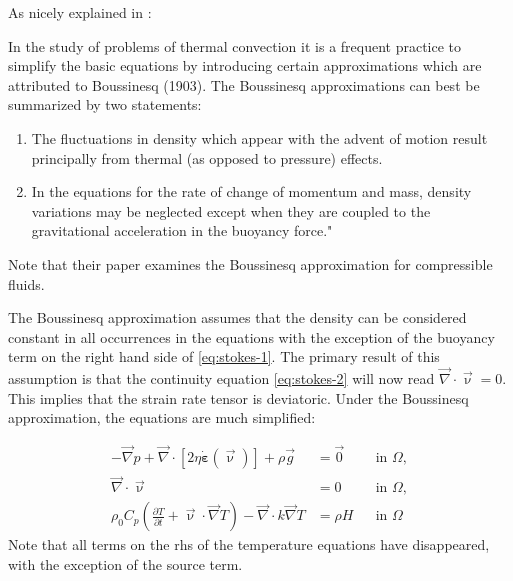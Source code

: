 \documentclass[a4paper]{article}
\begin{document}
\noindent As nicely explained in \textcite{spve60}: 
\begin{displayquote}
{\color{darkgray}
In the study of problems of thermal convection it is a frequent practice to simplify the basic 
equations by introducing certain approximations which are attributed to
Boussinesq (1903). The Boussinesq approximations can best be summarized by two
statements: 
\begin{enumerate}
\item The fluctuations in density which appear with the advent of motion
result principally from thermal (as opposed to pressure) effects. 
\item In the equations
for the rate of change of momentum and mass, density variations may be neglected except
when they are coupled to the gravitational acceleration in the buoyancy force."
\end{enumerate}
}
\end{displayquote}
Note that their paper examines the Boussinesq approximation for compressible fluids.  

The Boussinesq approximation assumes that the density can be
considered constant in all occurrences in the equations with the exception of
the buoyancy term on the right hand side of \eqref{eq:stokes-1}. The primary
result of this assumption is that the continuity equation \eqref{eq:stokes-2}
will now read ${\vec \nabla}\cdot{\vec \upnu} = 0$.
This implies that the strain rate tensor is deviatoric.
Under the Boussinesq approximation, the equations are much simplified:

\begin{align}
  -\vec\nabla p + \vec\nabla \cdot \left[2\eta \dot{\bm \varepsilon}(\vec\upnu) \right] + \rho \vec{g} &= \vec{0}
  &
  & \textrm{in $\Omega$},  \\
  \vec\nabla \cdot  \vec\upnu &= 0 
  &
  & \textrm{in $\Omega$},
  \\
  \rho_0 C_p \left(\frac{\partial T}{\partial t} + \vec\upnu \cdot\vec\nabla T\right)
  - \vec\nabla\cdot k\vec\nabla T
  &=
  \rho H
  &
  & \textrm{in $\Omega$}
\end{align}
Note that all terms on the rhs of the temperature equations have disappeared, with the exception 
of the source term.
\end{document}
